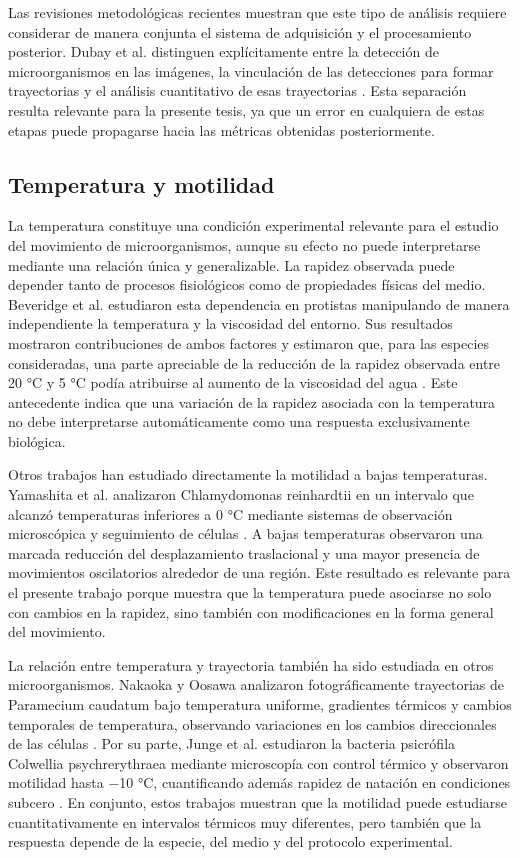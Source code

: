 Las revisiones metodológicas recientes muestran que este tipo de análisis requiere considerar de manera conjunta el sistema de adquisición y el procesamiento posterior. Dubay et al. distinguen explícitamente entre la detección de microorganismos en las imágenes, la vinculación de las detecciones para formar trayectorias y el análisis cuantitativo de esas trayectorias \cite{dubay2023}. Esta separación resulta relevante para la presente tesis, ya que un error en cualquiera de estas etapas puede propagarse hacia las métricas obtenidas posteriormente.

\subsection{Temperatura y motilidad}

La temperatura constituye una condición experimental relevante para el estudio del movimiento de microorganismos, aunque su efecto no puede interpretarse mediante una relación única y generalizable. La rapidez observada puede depender tanto de procesos fisiológicos como de propiedades físicas del medio. Beveridge et al. estudiaron esta dependencia en protistas manipulando de manera independiente la temperatura y la viscosidad del entorno. Sus resultados mostraron contribuciones de ambos factores y estimaron que, para las especies consideradas, una parte apreciable de la reducción de la rapidez observada entre 20 °C y 5 °C podía atribuirse al aumento de la viscosidad del agua \cite{beveridge2010}. Este antecedente indica que una variación de la rapidez asociada con la temperatura no debe interpretarse automáticamente como una respuesta exclusivamente biológica.

Otros trabajos han estudiado directamente la motilidad a bajas temperaturas. Yamashita et al. analizaron Chlamydomonas reinhardtii en un intervalo que alcanzó temperaturas inferiores a 0 °C mediante sistemas de observación microscópica y seguimiento de células \cite{yamashita2024}. A bajas temperaturas observaron una marcada reducción del desplazamiento traslacional y una mayor presencia de movimientos oscilatorios alrededor de una región. Este resultado es relevante para el presente trabajo porque muestra que la temperatura puede asociarse no solo con cambios en la rapidez, sino también con modificaciones en la forma general del movimiento.

La relación entre temperatura y trayectoria también ha sido estudiada en otros microorganismos. Nakaoka y Oosawa analizaron fotográficamente trayectorias de Paramecium caudatum bajo temperatura uniforme, gradientes térmicos y cambios temporales de temperatura, observando variaciones en los cambios direccionales de las células \cite{nakaoka1977}. Por su parte, Junge et al. estudiaron la bacteria psicrófila Colwellia psychrerythraea mediante microscopía con control térmico y observaron motilidad hasta −10 °C, cuantificando además rapidez de natación en condiciones subcero \cite{junge2003}. En conjunto, estos trabajos muestran que la motilidad puede estudiarse cuantitativamente en intervalos térmicos muy diferentes, pero también que la respuesta depende de la especie, del medio y del protocolo experimental.

